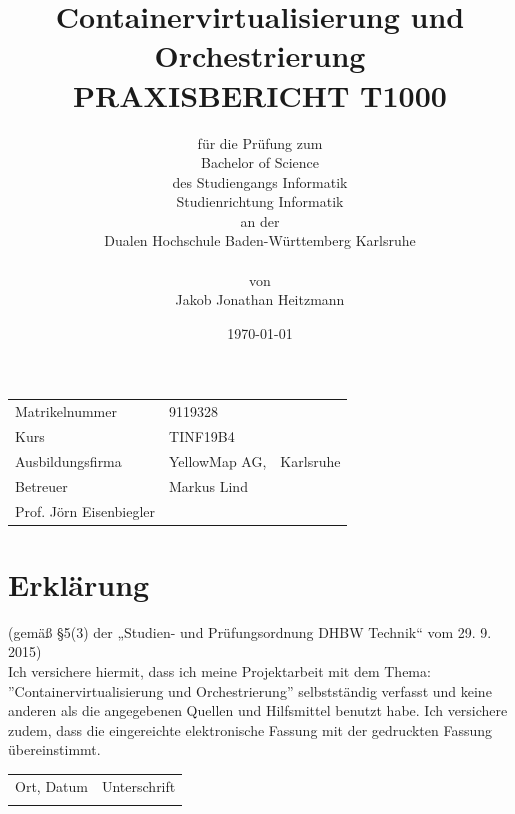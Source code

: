 \documentclass[12pt,a4paper]{scrartcl}
\title{\Large{\bfseries Containervirtualisierung und Orchestrierung\\}\vspace{1cm}
	\large PRAXISBERICHT T1000\vspace{1cm}}
\author{
	\normalsize für die Prüfung zum\\
	\normalsize Bachelor of Science\\
	\normalsize des Studiengangs Informatik\\
	\normalsize Studienrichtung Informatik\\
	\normalsize an der\\
	\normalsize Dualen Hochschule Baden-Württemberg Karlsruhe\\\\
	\normalsize von\\
	\normalsize Jakob Jonathan Heitzmann
}
\date{\today}
\begin{document}
\maketitle
\vspace*{\fill}
\thispagestyle{empty}



\begin{tabular}{p{5cm}ll}
	Matrikelnummer & 9119328\\
	Kurs & TINF19B4\\
	Ausbildungsfirma & YellowMap AG, & Karlsruhe\\
	Betreuer & Markus Lind\\
	Prof. Jörn Eisenbiegler
\end{tabular}

\newpage


\section*{Erklärung}
(gemäß §5(3) der „Studien- und Prüfungsordnung DHBW Technik“ vom 29. 9. 2015)\\
Ich versichere hiermit, dass ich meine Projektarbeit mit dem Thema: ''Containervirtualisierung und Orchestrierung'' selbstständig verfasst und keine anderen als die angegebenen Quellen und Hilfsmittel benutzt habe. Ich versichere zudem, dass die eingereichte elektronische Fassung mit der gedruckten Fassung übereinstimmt.\\

\vspace*{2.5cm}

\begin{tabular}{lr}
\hline
\rule{0pt}{2ex}
Ort, Datum & Unterschrift
\\
\hspace{90mm} & \hspace{50mm} 
\end{tabular}
\newpage

\tableofcontents
{}
\newpage
\listoffigures
{}
\newpage
\printglossary
{}
\newpage

\end{document}
